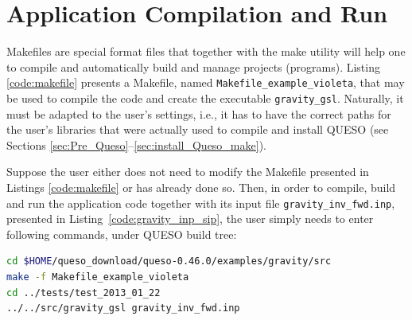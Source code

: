  
\section{Application Compilation and Run}\label{sec:application_compilation}


Makefiles are special format files that together with the make utility will help one to compile and automatically build and manage projects (programs).
Listing \ref{code:makefile} presents a Makefile, named \texttt{Makefile\_example\_violeta}, that may be used to compile the code and create the executable \verb+gravity_gsl+. Naturally, it must be adapted to the user's settings, i.e., it has to have the correct paths for the user's libraries that were actually used to compile and install QUESO (see Sections \ref{sec:Pre_Queso}--\ref{sec:install_Queso_make}).





Suppose the user either does not need to modify the Makefile presented in Listings \ref{code:makefile} or has already done so. Then, in order to compile, build and run the application code together  with its input file \verb+gravity_inv_fwd.inp+, presented in Listing~\ref{code:gravity_inp_sip}, the user simply needs to enter following commands, under QUESO build tree:
\begin{lstlisting}[caption={}, label={},language={bash}]
cd $HOME/queso_download/queso-0.46.0/examples/gravity/src
make -f Makefile_example_violeta
cd ../tests/test_2013_01_22
../../src/gravity_gsl gravity_inv_fwd.inp
\end{lstlisting}



% 

